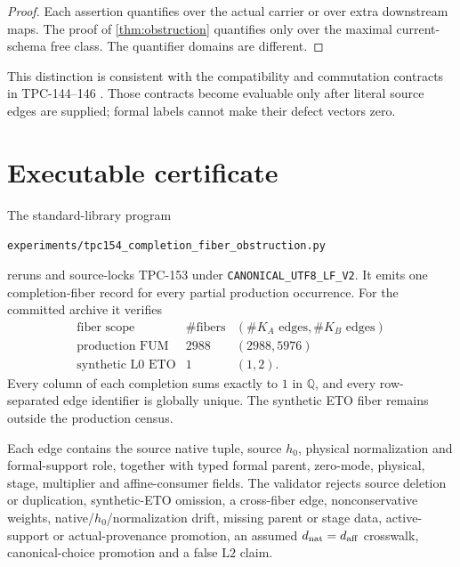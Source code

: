 \documentclass[11pt]{article}
\theoremstyle{definition}
\theoremstyle{remark}
\newcommand{\Ltwo}{\mathrm{L2}}
\begin{document}
\begin{proof}
Each assertion quantifies over the actual carrier or over extra
downstream maps.  The proof of \cref{thm:obstruction} quantifies only
over the maximal current-schema free class.  The quantifier domains
are different.
\end{proof}

This distinction is consistent with the compatibility and
commutation contracts in TPC-144--146
\citep{WangTPC144,WangTPC145,WangTPC146}.  Those contracts become
evaluable only after literal source edges are supplied; formal labels
cannot make their defect vectors zero.

\section{Executable certificate}

The standard-library program
\begin{center}
\small
\texttt{experiments/tpc154\_completion\_fiber\_obstruction.py}
\end{center}
reruns and source-locks TPC-153 under
\texttt{CANONICAL\_UTF8\_LF\_V2}.  It emits one completion-fiber
record for every partial production occurrence.  For the committed
archive it verifies
\[
 \begin{array}{c|c|c}
 \text{fiber scope}&\#\text{fibers}&
       (\#K_A\text{ edges},\#K_B\text{ edges})\\ \hline
 \text{production FUM}&2988&(2988,5976)\\
 \text{synthetic L0 ETO}&1&(1,2).
 \end{array}
\]
Every column of each completion sums exactly to \(1\) in
\(\mathbb Q\), and every row-separated edge identifier is globally
unique.  The synthetic ETO fiber remains outside the production
census.

Each edge contains the source native tuple, source \(h_0\), physical
normalization and formal-support role, together with typed formal
parent, zero-mode, physical, stage, multiplier and affine-consumer
fields.  The validator rejects source deletion or duplication,
synthetic-ETO omission, a cross-fiber edge, nonconservative weights,
native/\(h_0\)/normalization drift, missing parent or stage data,
active-support or actual-provenance promotion, an assumed
\(d_{\rm nat}=d_{\rm aff}\) crosswalk, canonical-choice promotion and
a false \(\Ltwo\) claim.
\end{document}

